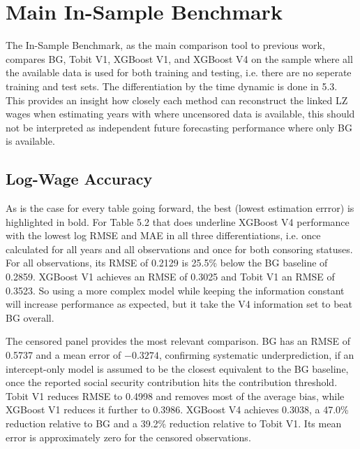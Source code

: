 \documentclass[12pt,a4paper,oneside,titlepage]{book}
\newif\ifthesisdraft
\newcommand{\draftnote}[1]{%
  \ifthesisdraft
    \par\noindent\colorbox{yellow!20}{%
      \parbox{0.94\textwidth}{\textbf{Draft note:} #1}%
    }\par
  \fi
}
\begin{document}
\section{Main In-Sample Benchmark}
\draftnote{Compare the BG baseline, Tobit V1, XGBoost V1, and XGBoost V4 using log-wage and daily-wage-level metrics. Keep all, censored, and uncensored samples visibly separate and emphasise that this is an in-sample benchmark.}

The In-Sample Benchmark, as the main comparison tool to previous work, compares BG, Tobit V1, XGBoost V1, and XGBoost V4 on the sample where all the available data is used for both training and testing, i.e. there are no seperate training and test sets. The differentiation by the time dynamic is done in 5.3. This provides an insight how closely each method can reconstruct the linked LZ wages when estimating years with where uncensored data is available, this should not be interpreted as independent future forecasting performance where only BG is available.



\subsection{Log-Wage Accuracy}
As is the case for every table going forward, the best (lowest estimation errror) is highlighted in bold. For Table 5.2 that does underline XGBoost V4 performance with the lowest log RMSE and MAE in all three differentiations, i.e. once calculated for all years and all observations and once for both consoring statuses.
For all observations, its RMSE of 0.2129 is 25.5\% below the BG baseline of 0.2859. XGBoost V1 achieves an RMSE of 0.3025 and Tobit V1 an RMSE of 0.3523. So using a more complex model while keeping the information constant will increase performance as expected, but it take the V4 information set to beat BG overall.

The censored panel provides the most relevant comparison. BG has an RMSE of 0.5737 and a mean error of $-0.3274$, confirming systematic underprediction, if an intercept-only model is assumed to be the closest equivalent to the BG baseline, once the reported social security contribution hits the contribution threshold. Tobit V1 reduces RMSE to 0.4998 and removes most of the average bias, while XGBoost V1 reduces it further to 0.3986. XGBoost V4 achieves 0.3038, a 47.0\% reduction relative to BG and a 39.2\% reduction relative to Tobit V1. Its mean error is approximately zero for the censored observations.
\end{document}
